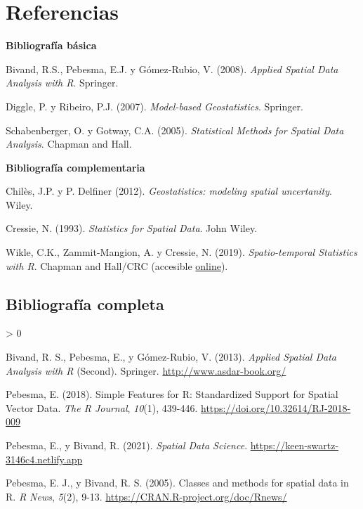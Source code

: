 \documentclass[
  spanish,
]{book}
\theoremstyle{break}
\newlength{\cslhangindent}
\newenvironment{CSLReferences}[2] %
 {%
  \setlength{\parindent}{0pt}
  \ifodd #1 \everypar{\setlength{\hangindent}{\cslhangindent}}\ignorespaces\fi
  \ifnum #2 > 0
  \setlength{\parskip}{#2\baselineskip}
  \fi
 }%
 {}
\begin{document}
\hypertarget{referencias}{%
\chapter*{Referencias}\label{referencias}}

\textbf{Bibliografía básica}

Bivand, R.S., Pebesma, E.J. y Gómez-Rubio, V. (2008). \emph{Applied Spatial Data Analysis with R}. Springer.

Diggle, P. y Ribeiro, P.J. (2007). \emph{Model-based Geostatistics}. Springer.

Schabenberger, O. y Gotway, C.A. (2005). \emph{Statistical Methods for Spatial Data Analysis}. Chapman and Hall.

\textbf{Bibliografía complementaria}

Chilès, J.P. y P. Delfiner (2012). \emph{Geostatistics: modeling spatial uncertanity}. Wiley.

Cressie, N. (1993). \emph{Statistics for Spatial Data}. John Wiley.

Wikle, C.K., Zammit-Mangion, A. y Cressie, N. (2019). \emph{Spatio-temporal Statistics with R}. Chapman and Hall/CRC (accesible \href{https://spacetimewithr.org}{online}).

\hypertarget{bibliografuxeda-completa}{%
\section*{Bibliografía completa}\label{bibliografuxeda-completa}}

\hypertarget{refs}{}
\begin{CSLReferences}{1}{0}
\leavevmode\hypertarget{ref-Bivand2013}{}%
Bivand, R. S., Pebesma, E., y Gómez-Rubio, V. (2013). \emph{Applied Spatial Data Analysis with {R}} (Second). Springer. \url{http://www.asdar-book.org/}

\leavevmode\hypertarget{ref-Pebesma2018}{}%
Pebesma, E. (2018). {Simple Features for R: Standardized Support for Spatial Vector Data}. \emph{{The R Journal}}, \emph{10}(1), 439-446. \url{https://doi.org/10.32614/RJ-2018-009}

\leavevmode\hypertarget{ref-Pebesma2021}{}%
Pebesma, E., y Bivand, R. (2021). \emph{Spatial Data Science}. \url{https://keen-swartz-3146c4.netlify.app}

\leavevmode\hypertarget{ref-Pebesma2005}{}%
Pebesma, E. J., y Bivand, R. S. (2005). Classes and methods for spatial data in {R}. \emph{R News}, \emph{5}(2), 9-13. \url{https://CRAN.R-project.org/doc/Rnews/}

\end{CSLReferences}
\end{document}
